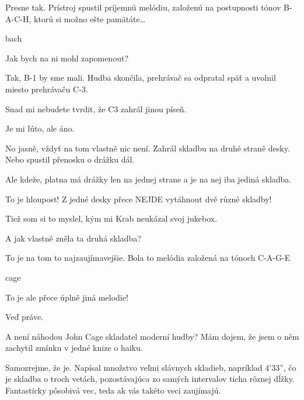 \documentclass[12pt]{article}
\begin{document}
\begin{description}[itemsep=0pt]
\item[Ž:] Presne tak. Prístroj spustil príjemnú melódiu, založenú na postupnosti 
    tónov B-A-C-H, ktorú si možno ešte pamätáte\dots
    
\item[melodia] bach

\item[A:] Jak bych na ni mohl zapomenout?

\item[Ž:] Tak, B-1 by sme mali. Hudba skončila, prehrávač sa odpratal späť a 
    uvolnil miesto prehrávaču C-3.

\item[A:] Snad mi nebudete tvrdit, že C3 zahrál jinou píseň.

\item[Ž:] Je mi ľúto, ale áno.

\item[A:] No jasně, vždyť na tom vlastně nic není. Zahrál skladbu na druhé straně desky.
    Nebo spustil přenosku o drážku dál.

\item[Ž:] Ale kdeže, platna má drážky len na jednej strane a je na nej iba jediná skladba.

\item[A:] To je hloupost! Z jedné desky přece NEJDE vytáhnout dvě různé skladby!

\item[Ž:] Tiež som si to myslel, kým mi Krab neukázal svoj jukebox.

\item[A:] A jak vlastně zněla ta druhá skladba?

\item[Ž:] To je na tom to najzaujímavejšie. Bola to melódia založená na tónoch C-A-G-E

\item[melodia] cage

\item[A:] To je ale přece úplně jiná melodie!

\item[Ž:] Veď práve.

\item[A:] A není náhodou John Cage skladatel moderní hudby? Mám dojem, že jsem o něm
    zachytil zmínku v jedné knize o haiku.

\item[Ž:] Samozrejme, že je. Napísal množstvo veľmi slávnych skladieb, napríklad 4'33'', 
    čo je skladba o troch vetách, pozostávajúca zo samých intervalov ticha rôznej dĺžky. 
    Fantasticky pôsobivá vec, teda ak vás takéto veci zaujímajú.


\end{description}
\end{document}
